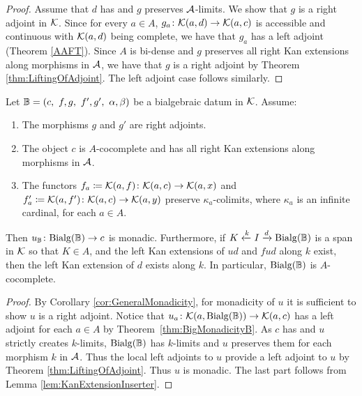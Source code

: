 \begin{proof}
    Assume that $d$ has and $g$ preserves $\mathcal{A}$-limits. We show that $g$ is a right adjoint in $\mathcal{K}$. Since for every $a\in A$, $g_a\colon \mathcal{K}(a,d)\to \mathcal{K}(a,c)$ is accessible and continuous with $\mathcal{K}(a,d)$ being complete, we have that $g_a$ has a left adjoint (Theorem \ref{AAFT}). Since $A$ is bi-dense and $g$ preserves all right Kan extensions along morphisms in $\mathcal{A}$, we have that $g$ is a right adjoint by Theorem \ref{thm:LiftingOfAdjoint}. The left adjoint case follows similarly.
\end{proof}
\begin{theorem}\label{thm:2CategoricalMonadicityForBialgebras}
    Let $\mathbb{B} = (c,\ f,g,\ f',g',\ \alpha,\beta)$ be a bialgebraic datum in $\mathcal{K}$. Assume:
    \begin{enumerate}
        \item The morphisms $g$ and $g'$ are right adjoints.
        \item The object $c$ is $A$-cocomplete and has all right Kan extensions along morphisms in $\mathcal{A}$.
        \item The functors $f_a\coloneqq \mathcal{K}(a,f)\colon \mathcal{K}(a,c)\to \mathcal{K}(a,x)$ and $f_a'\coloneqq \mathcal{K}(a,f')\colon \mathcal{K}(a,c)\to \mathcal{K}(a,y)$ preserve $\kappa_a$-colimits, where $\kappa_a$ is an infinite cardinal, for each $a\in A$. 
    \end{enumerate} 
    Then $u_{\mathbb{B}}\colon \mathrm{Bialg}(\mathbb{B})\to c$ is monadic. Furthermore, if $K\xleftarrow{k}I\xrightarrow{d} \mathrm{Bialg}(\mathbb{B})$ is a span in $\mathcal{K}$ so that $K\in A$, and the left Kan extensions of $ud$ and $fud$ along $k$ exist, then the left Kan extension of $d$ exists along $k$. In particular, $\mathrm{Bialg}(\mathbb{B})$ is $A$-cocomplete.
\end{theorem}
\begin{proof}
    By Corollary \ref{cor:GeneralMonadicity}, for monadicity of $u$ it is sufficient to show $u$ is a right adjoint. Notice that $u_a\colon \mathcal{K}(a,\mathrm{Bialg}(\mathbb{B}))\to \mathcal{K}(a,c)$ has a left adjoint for each $a\in A$ by Theorem~\ref{thm:BigMonadicityB}. As $c$ has and $u$ strictly creates $k$-limits, $\mathrm{Bialg}(\mathbb{B})$ has $k$-limits and $u$ preserves them for each morphism $k$ in $\mathcal{A}$. Thus the local left adjoints to $u$ provide a left adjoint to $u$ by Theorem \ref{thm:LiftingOfAdjoint}. Thus $u$ is monadic. The last part follows from Lemma \ref{lem:KanExtensionInserter}.
\end{proof}

